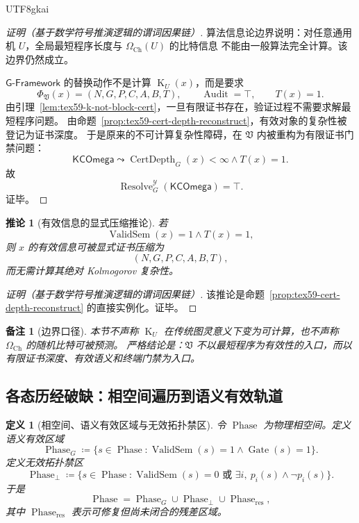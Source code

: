 \documentclass[12pt]{article}
\newtheorem{definition}{定义}[section]
\newtheorem{corollary}{推论}[section]
\newtheorem{remark}{备注}[section]
\newcommand{\GFramework}{\textsf{G-Framework}}
\newcommand{\Vsys}{\mathfrak V}
\newcommand{\DefEq}{\coloneqq}
\newcommand{\OmegaCh}{\Omega_{\mathrm{Ch}}}
\DeclareMathOperator{\Audit}{Audit}
\DeclareMathOperator{\Resolve}{Resolve}
\DeclareMathOperator{\Gate}{Gate}
\DeclareMathOperator{\ValidSem}{ValidSem}
\DeclareMathOperator{\KComplex}{K}
\DeclareMathOperator{\CertDepth}{CertDepth}
\DeclareMathOperator{\Phase}{Phase}
\begin{document}
\begin{CJK*}{UTF8}{gkai}
\begin{proof}[证明（基于数学符号推演逻辑的谓词因果链）]
算法信息论边界说明：对任意通用机 \(U\)，全局最短程序长度与 \(\OmegaCh(U)\) 的比特信息
不能由一般算法完全计算。该边界仍然成立。

\(\GFramework{}\) 的替换动作不是计算 \(\KComplex_U(x)\)，而是要求
\[
  \Phi_{\Vsys}(x)=(N,G,P,C,A,B,T),
  \qquad
  \Audit=\top,
  \qquad
  T(x)=1.
\]
由引理~\ref{lem:tex59-k-not-block-cert}，一旦有限证书存在，验证过程不需要求解最短程序问题。
由命题~\ref{prop:tex59-cert-depth-reconstruct}，有效对象的复杂性被登记为证书深度。
于是原来的不可计算复杂性障碍，在 \(\Vsys\) 内被重构为有限证书门禁问题：
\[
  \mathsf{KCOmega}
  \leadsto
  \CertDepth_G(x)<\infty
  \wedge
  T(x)=1.
\]
故
\[
  \Resolve_G^{\mathcal Y}(\mathsf{KCOmega})=\top.
\]
证毕。
\end{proof}

\begin{corollary}[有效信息的显式压缩推论]
\label{cor:tex59-kc-whitebox-compression}
若
\[
  \ValidSem(x)=1\wedge T(x)=1,
\]
则 \(x\) 的有效信息可被显式证书压缩为
\[
  (N,G,P,C,A,B,T),
\]
而无需计算其绝对 Kolmogorov 复杂性。
\end{corollary}

\begin{proof}[证明（基于数学符号推演逻辑的谓词因果链）]
该推论是命题~\ref{prop:tex59-cert-depth-reconstruct} 的直接实例化。证毕。
\end{proof}

\begin{remark}[边界口径]
本节不声称 \(\KComplex_U\) 在传统图灵意义下变为可计算，也不声称 \(\OmegaCh\) 的随机比特可被预测。
严格结论是：\(\Vsys\) 不以最短程序为有效性的入口，而以有限证书深度、有效语义和终端门禁为入口。
\end{remark}

\subsection{各态历经破缺：相空间遍历到语义有效轨道}
\label{subsec:tex59-ergodic-break}

\begin{definition}[相空间、语义有效区域与无效拓扑禁区]
\label{def:tex59-semantic-phase-space}
令 \(\Phase\) 为物理相空间。定义语义有效区域
\[
  \Phase_G
  \DefEq
  \{s\in\Phase:\ValidSem(s)=1\wedge\Gate(s)=1\}.
\]
定义无效拓扑禁区
\[
  \Phase_{\bot}
  \DefEq
  \{s\in\Phase:\ValidSem(s)=0
  \text{ 或 }
  \exists i,\ p_i(s)\wedge\neg p_i(s)\}.
\]
于是
\[
  \Phase=\Phase_G\cup\Phase_{\bot}\cup\Phase_{\mathrm{res}},
\]
其中 \(\Phase_{\mathrm{res}}\) 表示可修复但尚未闭合的残差区域。
\end{definition}


\end{CJK*}
\end{document}
